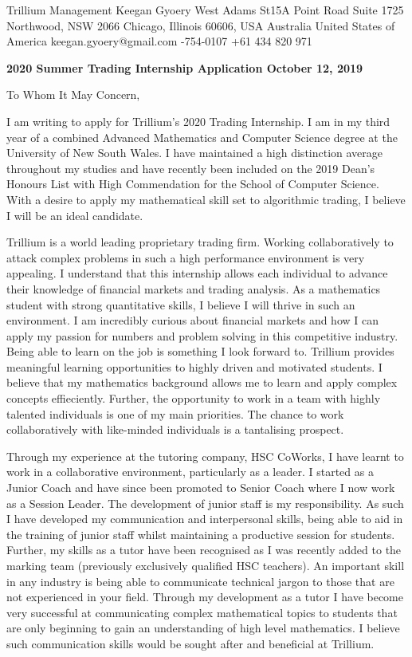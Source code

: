 \documentclass[a4paper,11pt]{article}
\begin{document}
Trillium Management \hfill Keegan Gyoery  West Adams St\hfill 15A Point Road \break
Suite 1725 \hfill Northwood, NSW 2066 \break
Chicago, Illinois 60606, USA \hfill Australia \break
United States of America \hfill keegan.gyoery@gmail.com -754-0107 \hfill +61 434 820 971 \break

\vspace{5mm}
\textbf{2020 Summer Trading Internship Application October 12, 2019} \par
To Whom It May Concern, \par

I am writing to apply for Trillium’s 2020 Trading Internship. I am in my third year of a
combined Advanced Mathematics and Computer Science degree at the University of New South
Wales. I have maintained a high distinction average throughout my studies and have recently been
included on the 2019 Dean’s Honours List with High Commendation for the School of Computer
Science. With a desire to apply my mathematical skill set to algorithmic trading, I believe I will
be an ideal candidate.\par

Trillium is a world leading proprietary trading firm. Working collaboratively to attack complex problems in such a high performance environment is very appealing. I understand that this internship allows each individual to advance their knowledge of financial markets and trading analysis. As a mathematics student with strong quantitative skills, I believe I will thrive in such an environment. I am incredibly curious about financial markets and how I can apply my passion for numbers and problem solving in this competitive industry. Being able to learn on the job is something I look forward to. Trillium provides meaningful learning opportunities to highly driven and motivated students. I believe that my mathematics background allows me to learn and apply complex concepts effieciently. Further, the opportunity to work in a team with highly talented individuals is one of my main priorities. The chance to work collaboratively with like-minded individuals is a tantalising prospect.

Through my experience at the tutoring company, HSC CoWorks, I have learnt to work in a collaborative environment, particularly as a leader. I started as a Junior Coach and have since been promoted to Senior Coach where I now work as a Session Leader. The development of junior staff is my responsibility. As such I have developed my communication and interpersonal skills, being able to aid in the training of junior staff whilst maintaining a productive session for students. Further, my skills as a tutor have been recognised as I was recently added to the marking team (previously exclusively qualified HSC teachers). An important skill in any industry is being able to communicate technical jargon to those that are not experienced in your field. Through my development as a tutor I have become very successful at communicating complex mathematical topics to students that are only beginning to gain an understanding of high level mathematics. I believe such communication skills would be sought after and beneficial at Trillium.\par
\end{document}
